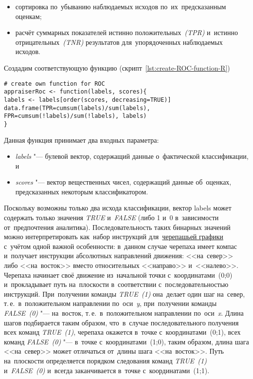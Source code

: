 \documentclass[]{scrreprt}
\begin{document}
\begin{itemize}
	\item сортировка по~убыванию наблюдаемых исходов по~их~предсказанным оценкам;
	\item расчёт суммарных показателей истинно положительных~\emph{(TPR)} и~истинно отрицательных~\emph{(TNR)} результатов для~упорядоченных наблюдаемых исходов.
\end{itemize}
Создадим соответствующую функцию (скрипт~\ref{lst:create-ROC-function-R})
%
\begin{lstlisting}[float, caption = Создание функции для~расчёта TPR и~FPR, firstnumber=1, label= lst:create-ROC-function-R]
# create own function for ROC
appraiserRoc <- function(labels, scores){
labels <- labels[order(scores, decreasing=TRUE)]
data.frame(TPR=cumsum(labels)/sum(labels),
FPR=cumsum(!labels)/sum(!labels), labels)
} 
\end{lstlisting}
%
Данная функция принимает два входных параметра:
\begin{itemize}
	\item \emph{labels} "--- булевой вектор, содержащий данные о~фактической классификации, и
	\item \emph{scores} "--- вектор вещественных чисел, содержащий данные об~оценках, предсказанных некоторым классификатором.
\end{itemize}
Поскольку возможны только два исхода классификации, вектор labels может содержать только значения \emph{TRUE} и~\emph{FALSE} (либо 1 и~0 в~зависимости от~предпочтения аналитика). Последовательность таких бинарных значений можно интерпретировать как~набор инструкций для~\href{https://en.wikipedia.org/wiki/Turtle_graphics}{черепашьей графики}~\cite{Wiki:turtle-graphics} с~учётом одной важной особенности: в~данном случае черепаха имеет компас и~получает инструкции абсолютных направлений движения: <<на~север>> либо <<на~восток>> вместо относительных <<направо>> и~<<налево>>. Черепаха начинает своё движение из~начальной точки с~координатами~(0;0) и~прокладывает путь на~плоскости в~соответствии с~последовательностью инструкций. При~получении команды \emph{TRUE~(1)} она~делает один шаг на~север, т.\,е.~в~положительном направлении по~оси~\emph{y}, при~получении команды \emph{FALSE~(0)} "--- на~восток, т.\,е.~в~положительном направлении по~оси~\emph{x}. Длина шагов подбирается таким образом, что~в~случае последовательного получения всех команд \emph{TRUE~(1)}, черепаха окажется в~точке с~координатами~(0;1), всех команд \emph{FALSE~(0)} "--- в~точке с~координатами~(1;0), таким образом, длина шага <<на~север>> может отличаться от~длины шага <<на~восток>>. Путь на~плоскости определяется порядком следования команд \emph{TRUE~(1)} и~\emph{FALSE~(0)} и~всегда заканчивается в~точке с~координатами~(1;1).
\end{document}
